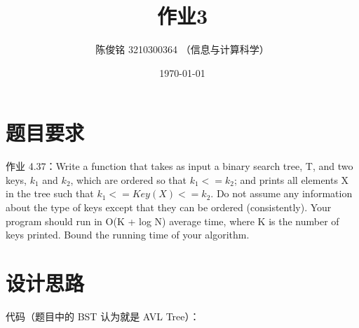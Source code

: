 \documentclass[a4paper]{article}
\title{作业3}
\author{陈俊铭 3210300364 （信息与计算科学）}
\date{\today}
\begin{document}
\maketitle
\section{题目要求}
作业 4.37：Write a function that takes as input a binary search tree, T, and two keys, $k_1$ and $k_2$, which are ordered so that $k_1 <= k_2$; and prints all elements X in the tree such that $k_1 <= Key(X) <= k_2$. Do not assume any information about the type of keys except that they can be ordered (consistently). Your program should run in O(K + log N) average time, where K is the number of keys printed. Bound the running time of your algorithm.

\section{设计思路}
代码（题目中的 BST 认为就是 AVL Tree）：
\end{document}
